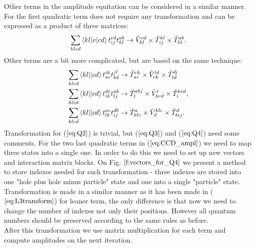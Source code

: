 \documentclass[twoside,english]{uiofysmaster}
\theoremstyle{definition}
\begin{document}
Other terms in the amplitude equitation can be considered in a similar manner. For the first quadratic term does not require any transformation and can be expressed as a product of three matrices:
\begin{equation}
\sum_{klcd}\braket{kl|v|cd}t_{ij}^{cd} t_{kl}^{ab} \rightarrow \tilde{V}_{kl}^{cd} \times \tilde{T}_{ij}^{kl} \times \tilde{T}_{kl}^{ab }. 
\end{equation}
Other terms are a bit more complicated, but are based on the same technique:
\begin{align}
\sum_{klcd}\braket{kl||cd}t_{ac}^{ik} t_{bd}^{jl}   &\rightarrow  \tilde{T}_{ai}^{ck}\times\tilde{V}_{ck}^{ld}\times\tilde{T}_{ld}^{dj} \label{eq:Q2} \\ 
\sum_{klcd}\braket{kl||cd}t_{ik}^{dc}t_{lj}^{ab} &\rightarrow     \tilde{T}_{l}^{abj}\times \tilde{V}_{kcd}^{l} \times  \tilde{T}_{i}^{kcd}, \label{eq:Q3} \\ 
\sum_{klcd}\braket{kl||cd}t_{lk}^{ac}t_{ij}^{db} &\rightarrow \tilde{T}_{klc}^{a} \times  \tilde{V}_{d}^{klc}\times \tilde{T}_{bij}^{d}. \label{eq:Q4}
\end{align}
Transformation for ($\ref{eq:Q2}$) is trivial, but ($\ref{eq:Q3}$) and ($\ref{eq:Q4}$) need some comments. For the two last quadratic terms in ($\ref{eq:CCD_ampl}$) we need to map three states into a single one. In order to do this we need to set up new vectors and interaction matrix blocks. On Fig. $\ref{f:vectors_for_Q4}$ we present a method to store indexes needed for such transformation - three indexes are stored into one "hole plus hole minus particle" state and one into a single "particle" state. Transformation is made in a similar manner as it has been made in  ($\ref{eq:L3transform}$) for leaner term, the only difference is that now we need to change the number of indexes not only their positions. However all quantum numbers should be preserved according to the same rules as before.\\
After this transformation we use matrix multiplication for each term and compute amplitudes on the next iteration. 
\end{document}

